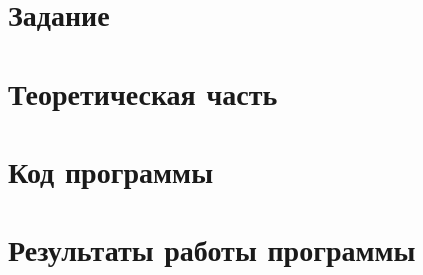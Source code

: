 \documentclass[12pt, a4paper]{article}
\begin{document}
	
	
	
	\section{Задание}
	
	
	\section{Теоретическая часть}
	
	\newpage
	
	\newpage
	\section{Код программы}
	
	
	\section{Результаты работы программы}
	
	\newpage
	

	
\end{document}
